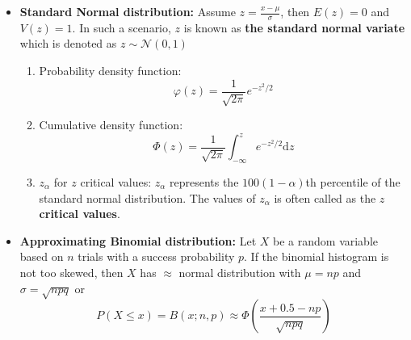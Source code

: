 \documentclass[a4paper]{article}
\begin{document}
\begin{itemize}
    \item \textbf{Standard Normal distribution: } Assume $z = \frac{x-\mu}{\sigma}$, then $E(z) = 0$ and $V(z) = 1$. In such a scenario, $z$ is known as \textbf{the standard normal variate} which is denoted as $z\sim\mathcal{N}(0,1)$
    \begin{enumerate}
        \item Probability density function:
        \begin{equation*}
            \varphi(z) = \frac{1}{\sqrt{2\pi}}e^{-z^2/2}
        \end{equation*}
        \item Cumulative density function:
        \begin{equation*}
            \Phi(z) = \frac{1}{\sqrt{2\pi}}\int_{-\infty}^{z} e^{-z^2/2}\mathrm{d}z
        \end{equation*}
        \item $z_\alpha$ for $z$ critical values: $z_\alpha$ represents the $100(1-\alpha)$th percentile of the standard normal distribution. The values of $z_\alpha$ is often called as the $z$ \textbf{critical values}.
        \begin{center}
        \end{center}
    \end{enumerate}
    \item \textbf{Approximating Binomial distribution:}
    Let $X$ be a random variable based on $n$ trials with a success probability $p$. If the binomial histogram is not too skewed, then $X$ has $\approx$ normal distribution with $\mu = np$ and $\sigma = \sqrt{npq}$ or 
    \begin{equation*}
        P(X\leq x) = B(x; n,p) \approx \Phi\left(\frac{x+0.5-np}{\sqrt{npq}}\right)
    \end{equation*}
    

\end{itemize}
\end{document}
